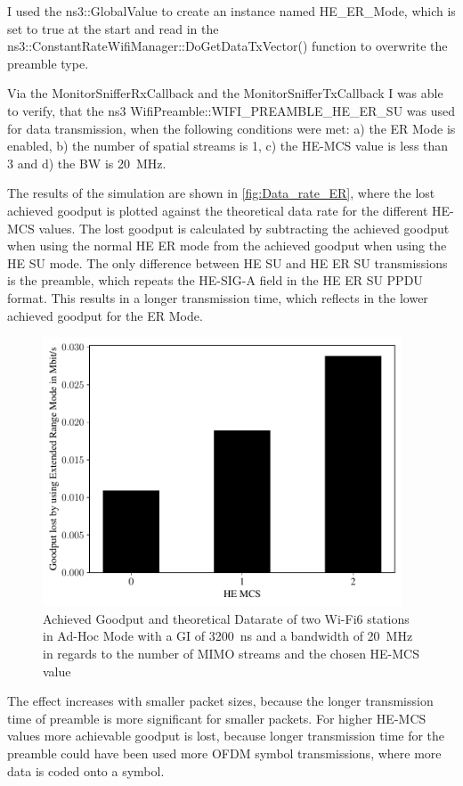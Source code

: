 I used the ns3::GlobalValue to create an instance named HE\_ER\_Mode, which is set to true at the start and read in the ns3::ConstantRateWifiManager::DoGetDataTxVector() function
to overwrite the preamble type.

Via the MonitorSnifferRxCallback and the MonitorSnifferTxCallback I was able to verify, that the ns3 WifiPreamble::WIFI\_PREAMBLE\_HE\_ER\_SU was used
for data transmission, when the following conditions were met: a) the \ac{ER} Mode is enabled, b) the number of spatial streams is \num{1}, c) the HE-\ac{MCS} value is less than \num{3} and
d) the \ac{BW} is \SI{20}{\mega\hertz}.

The results of the simulation are shown in \autoref{fig:Data_rate_ER}, where the lost achieved goodput is plotted against the theoretical data rate for the different HE-\ac{MCS} values.
The lost goodput is calculated by subtracting the achieved goodput when using the normal \ac{HE} \ac{ER} mode from the achieved goodput when using the \ac{HE} SU mode.
The only difference between \ac{HE} SU and \ac{HE} \ac{ER} SU transmissions is the preamble, which repeats the HE-SIG-A field in the \ac{HE} \ac{ER} SU \ac{PPDU} format.
This results in a longer transmission time, which reflects in the lower achieved goodput for the \ac{ER} Mode.
\begin{figure}[H]%
	\centering
	\includegraphics[width=0.95\textwidth]{figures/ER_dataRate_simulation.pdf}
	\caption{Achieved Goodput and theoretical Datarate of two Wi-Fi6 stations in Ad-Hoc Mode with a \acf{GI} of \SI{3200}{\nano\second} and a bandwidth of \SI{20}{\mega\hertz} in regards to the number of \acf{MIMO} streams and the chosen HE-\ac{MCS} value}%
	\label{fig:Data_rate_ER}%
\end{figure}
The effect increases with smaller packet sizes, because the longer transmission time of preamble is more significant for smaller packets.
For higher HE-\ac{MCS} values more achievable goodput is lost, because longer transmission time for the preamble could have
been used more \ac{OFDM} symbol transmissions, where more data is coded onto a symbol.

